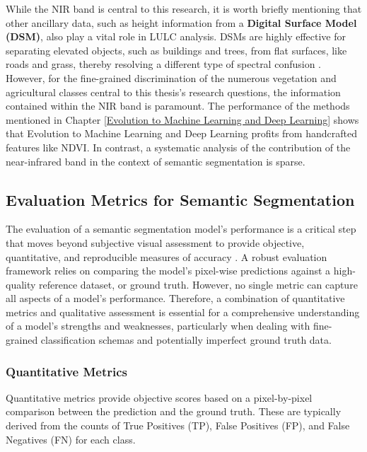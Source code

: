 \documentclass{report}
\begin{document}
While the NIR band is central to this research, it is worth briefly mentioning that other ancillary data, such as height information from a \textbf{Digital Surface Model (DSM)}, also play a vital role in LULC analysis. DSMs are highly effective for separating elevated objects, such as buildings and trees, from flat surfaces, like roads and grass, thereby resolving a different type of spectral confusion \parencites[p.~3148f.]{XuEtAlsemanticsegmentationmethodcategoryboundaryLandUseLandCoverLULCmappingVeryHighResolutionVHRremotesensingimage2021}. However, for the fine-grained discrimination of the numerous vegetation and agricultural classes central to this thesis's research questions, the information contained within the NIR band is paramount. The performance of the methods mentioned in Chapter \ref{Evolution to Machine Learning and Deep Learning} shows that Evolution to Machine Learning and Deep Learning profits from handcrafted features like NDVI. In contrast, a systematic analysis of the contribution of the near-infrared band in the context of semantic segmentation is sparse.


\subsection{Evaluation Metrics for Semantic Segmentation}
\label{sec:eval_metrics}
The evaluation of a semantic segmentation model's performance is a critical step that moves beyond subjective visual assessment to provide objective, quantitative, and reproducible measures of accuracy \parencite[p.~339f.]{CostaEtAlSupervisedmethodsimagesegmentationaccuracyassessmentlandcovermapping2018}. A robust evaluation framework relies on comparing the model's pixel-wise predictions against a high-quality reference dataset, or ground truth. However, no single metric can capture all aspects of a model's performance. Therefore, a combination of quantitative metrics and qualitative assessment is essential for a comprehensive understanding of a model's strengths and weaknesses, particularly when dealing with fine-grained classification schemas and potentially imperfect ground truth data.
\subsubsection{Quantitative Metrics}
Quantitative metrics provide objective scores based on a pixel-by-pixel comparison between the prediction and the ground truth. These are typically derived from the counts of True Positives (TP), False Positives (FP), and False Negatives (FN) for each class.
\end{document}
